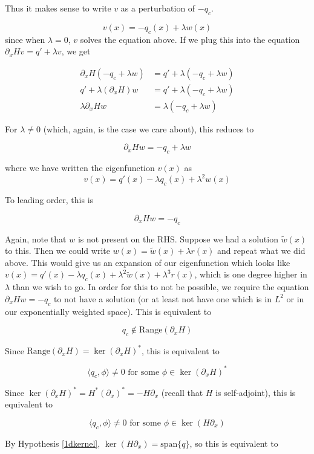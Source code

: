 \documentclass[12pt]{article}
\begin{document}
Thus it makes sense to write $v$ as a perturbation of $-q_c$.

\[
v(x) = -q_c(x) + \lambda w(x)
\]
since when $\lambda = 0$, $v$ solves the equation above. If we plug this into the equation $\partial_x H v = q' + \lambda v$, we get

\begin{align*}
\partial_x H(-q_c + \lambda w) &= q' + \lambda(-q_c + \lambda w) \\
q' + \lambda (\partial_x H) w &= q' + \lambda(-q_c + \lambda w) \\
\lambda \partial_x H w &= \lambda(-q_c + \lambda w)
\end{align*}

For $\lambda \neq 0$ (which, again, is the case we care about), this reduces to

\[
\partial_x H w = -q_c + \lambda w
\]

where we have written the eigenfunction $v(x)$ as
\[
v(x) = q'(x) - \lambda q_c(x) + \lambda^2 w(x)
\]

To leading order, this is

\[
\partial_x H w = -q_c
\]

Again, note that $w$ is not present on the RHS. Suppose we had a solution $\tilde{w}(x)$ to this. Then we could write $w(x) = \tilde{w}(x) + \lambda r(x)$ and repeat what we did above. This would give us an expansion of our eigenfunction which looks like $v(x) = q'(x) - \lambda q_c(x) + \lambda^2 \tilde{w}(x) + \lambda^3 r(x)$, which is one degree higher in $\lambda$ than we wish to go. In order for this to not be possible, we require the equation $\partial_x H w = -q_c$ to not have a solution (or at least not have one which is in $L^2$ or in our exponentially weighted space). This is equivalent to

\[
q_c \notin \textrm{Range}(\partial_x H)
\]

Since $\textrm{Range}(\partial_x H) = \ker (\partial_x H)^*$, this is equivalent to 

\[
\langle q_c, \phi \rangle \neq 0 \text{ for some }\phi \in \ker(\partial_x H)^*
\]

Since $\ker(\partial_x H)^* = H^* (\partial_x)^* = -H \partial_x$ (recall that $H$ is self-adjoint), this is equivalent to

\[
\langle q_c, \phi \rangle \neq 0 \text{ for some }\phi \in \ker(H \partial_x)
\]

By Hypothesis \ref{1dkernel}, $\ker(H \partial_x) = \textrm{span} \{q \}$, so this is equivalent to
\end{document}
